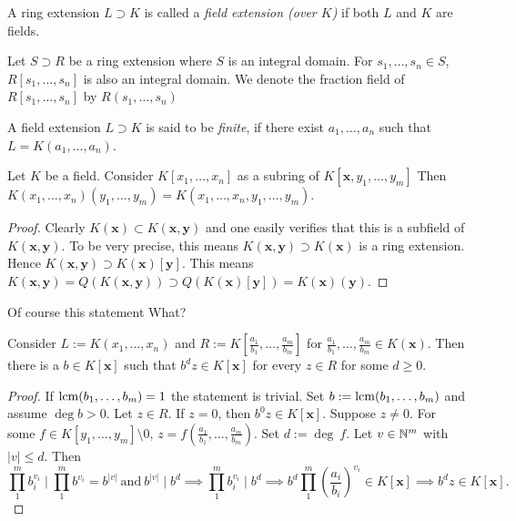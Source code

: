 \begin{definition}
    A ring extension $L\supset K$ is called a \textit{field extension (over $K$)} if both $L$ and $K$ are fields.
\end{definition}
Let $S\supset R$ be a ring extension where $S$ is an integral domain. For $s_1,\dots,s_n\in S$, $R[s_1,\dots,s_n]$ is also an integral domain. We denote the fraction field of $R[s_1,\dots,s_n]$ by $R(s_1,\dots,s_n)$
\begin{definition}
    A field extension $L\supset K$ is said to be \textit{finite}, if there exist $a_1,\dots,a_n$ such that $L = K(a_1,\dots,a_n)$.
\end{definition}
\begin{lemma}
    Let $K$ be a field. Consider $K[x_1,\dots,x_n]$ as a subring of $K[\mathbf{x},y_1,\dots,y_m]$ Then $K(x_1,\dots,x_n)(y_1,\dots,y_m) = K(x_1,\dots,x_n,y_1,\dots,y_m).$
\end{lemma}
\begin{proof}
    Clearly $K(\mathbf{x})\subset K(\mathbf{x},\mathbf{y})$ and one easily verifies that this is a subfield of $K(\mathbf{x},\mathbf{y})$. To be very precise, this means $K(\mathbf{x},\mathbf{y})\supset K(\mathbf{x})$ is a ring extension. Hence $K(\mathbf{x},\mathbf{y})\supset K(\mathbf{x})[\mathbf{y}]$. This means
    $K(\mathbf{x},\mathbf{y})= Q(K(\mathbf{x},\mathbf{y}))\supset Q(K(\mathbf{x})[\mathbf{y}])=K(\mathbf{x})(\mathbf{y})$.
\end{proof}
\begin{remark}
    Of course this statement {\Large What?}
\end{remark}
\begin{lemma}\label{CriterionForCheckingMembershipInAlgebra}
    Consider $L := K(x_1,\dots,x_n)$ and $R:= K\left[\frac{a_1}{b_1},\dots,\frac{a_m}{b_m}\right]$ for $\frac{a_1}{b_1},\dots,\frac{a_m}{b_m}\in K(\mathbf{x})$. Then there is a $b\in K[\mathbf{x}]$ such that $b^dz\in K[\mathbf{x}]$ for every $z\in R$ for some $d\geq 0$.
\end{lemma}
\begin{proof}
    If $\mathrm{lcm}(b_1,\dots,b_m)=1$ the statement is trivial. Set $b := \mathrm{lcm}(b_1,\dots,b_m)$ and assume $\deg b > 0$. Let $z\in R$. If $z=0$, then $b^0z\in K[\mathbf{x}]$. Suppose $z\neq 0$. For some $f\in K[y_1,\dots,y_m]\setminus 0$, $z = f\left(\frac{a_1}{b_1},\dots,\frac{a_m}{b_m}\right)$. Set $d := \deg \ f$. Let $v\in \mathbb{N}^m$ with $\vert v \vert \leq d$. Then 
    $$\prod_1^m b_i^{v_i}\mid \prod_1^m b^{v_i}= b^{\vert v\vert } \ \mathrm{and}\ b^{\vert v\vert} \mid b^d \implies \prod_1^m b_i^{v_i}\mid b^d \implies b^d\prod_1^m \left(\frac{a_i}{b_i}\right)^{v_i} \in K[\mathbf{x}]\implies b^dz\in K[\mathbf{x}].$$
\end{proof}
